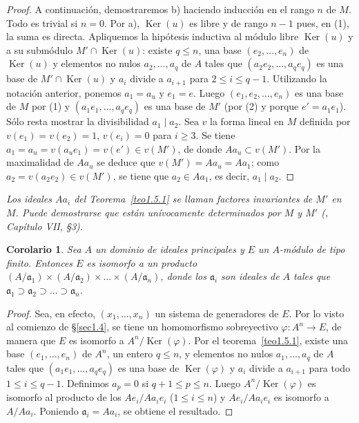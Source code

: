 \documentclass[10pt,oneside,bibtotoc,smallheadings,leqno,a5paper,DIV=12]{scrbook}
\newcommand{\idl}[1]{\mathfrak{#1}}
\newcommand{\QED}{}%
\renewcommand{\to}[1][]{\xrightarrow{#1}}
\DeclareMathOperator{\Ker}{Ker}
\numberwithin{equation}{section}
\newenvironment{comm}%
	{\begin{trivlist}\item\small\itshape}
	{\end{trivlist}}
\theoremstyle{defi}
\theoremstyle{enonce}
\newtheorem{corollary}{Corolario}
\theoremstyle{rem}
\numberwithin{theorem}{section}
\numberwithin{proposition}{section}
\numberwithin{definition}{section}
\numberwithin{lemma}{section}
\numberwithin{corollary}{section}
\numberwithin{example}{section}
\numberwithin{footnote}{section}%
\begin{document}
\begin{proof}
A continuaci\'on, demostraremos b) haciendo inducci\'on en el rango $n$ de $M$. Todo es trivial
si $n = 0$. Por a), $\Ker(u)$ es libre y de rango $n-1$ pues, en (1), la suma es directa. Apliquemos
la hip\'otesis inductiva al m\'odulo libre $\Ker(u)$ y a su subm\'odulo $M'\cap\Ker(u)$:
existe $q\leq n$, una base $(e_{2},\dots,e_{n})$ de $\Ker(u)$ y elementos no nulos
$a_{2},\dots,a_{q}$ de $A$ tales que $(a_{2}e_{2},\dots,a_{q}e_{q})$ es una base de
$M'\cap\Ker(u)$ y $a_{i}$ divide a $a_{i+1}$ para $2\leq i\leq q-1$. Utilizando la notaci\'on
anterior, ponemos $a_{1} = a_{u}$ y $e_{1} = e$. Luego $(e_{1},e_{2},\dots,e_{n})$ es una base
de $M$ por (1) y $(a_{1}e_{1},\dots,a_{q}e_{q})$ es una base de $M'$ (por (2) y porque
$e' = a_{1}e_{1}$). S\'olo resta mostrar la divisibilidad $a_{1}\mid a_{2}$. Sea $v$ la
forma lineal en $M$ definida por $v(e_{1}) = v(e_{2}) = 1$, $v(e_{i}) = 0$ para $i\geq 3$.
Se tiene $a_{1} = a_{u} = v(a_{u}e_{1}) = v(e')\in v(M')$, de donde $Aa_{u}\subset v(M')$.
Por la maximalidad de $Aa_{u}$ se deduce que $v(M') = Aa_{u} = Aa_{1}$; como $a_{2} = v(a_{2}e_{2})
\in v(M')$, se tiene que $a_{2}\in Aa_{1}$, es decir, $a_{1}\mid a_{2}$. \QED
\end{proof}

\begin{comm}
Los ideales $Aa_{i}$ del Teorema~\ref{teo1.5.1} se llaman {\em factores
invariantes} de $M'$ en $M$. Puede demostrarse que est\'an un\'ivocamente determinados
por $M$ y $M'$ (\cite{Bourbaki1}, Cap\'itulo VII, \S3).
\end{comm}

\begin{corollary}\label{cor1.5.1}
Sea $A$ un dominio de ideales principales y $E$ un $A$-m\'odulo
de tipo finito. Entonces $E$ es isomorfo a un producto
$(A/\idl{a}_{1})\times(A/\idl{a}_{2})\times\dots\times
(A/\idl{a}_{n})$, donde los $\idl{a}_{i}$ son ideales de $A$
tales que $\idl{a}_{1}\supset\idl{a}_{2}\supset\dots\supset
\idl{a}_{n}$.
\end{corollary}

\begin{proof}
Sea, en efecto, $(x_{1},\dots,x_{n})$ un sistema de generadores de $E$. Por lo visto
al comienzo de \S\ref{sec1.4}, se tiene un homomorfismo sobreyectivo $\varphi:A^{n}\to E$, de manera
que $E$ es isomorfo a $A^{n}/\Ker(\varphi)$. Por el teorema~\ref{teo1.5.1},
existe una base $(e_{1},\dots,e_{n})$
de $A^{n}$, un entero $q\leq n$, y elementos no nulos $a_{1},\dots,a_{q}$ de $A$ tales que
$(a_{1}e_{1},\dots,a_{q}e_{q})$ es una base de $\Ker(\varphi)$ y $a_{i}$ divide a $a_{i+1}$ para
todo $1\leq i\leq q-1$. Definimos $a_{p} = 0$ si $q+1\leq p\leq n$. Luego $A^{n}/\Ker(\varphi)$
es isomorfo al producto de los $Ae_{i}/Aa_{i}e_{i}$ ($1\leq i\leq n$) y $Ae_{i}/Aa_{i}e_{i}$
es isomorfo a $A/Aa_{i}$. Poniendo $\idl{a}_{i} = Aa_{i}$, se obtiene el resultado. \QED
\end{proof}
\end{document}
